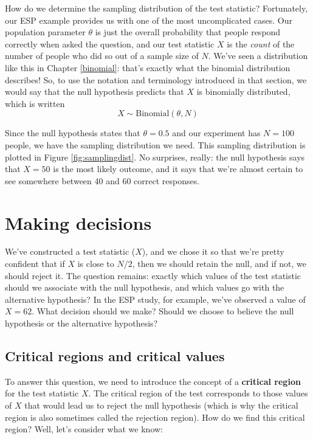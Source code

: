 \documentclass[
  11pt,
  a4paper,
  twoside,symmetric,openright]{book}
\theoremstyle{break}
\theoremstyle{break}
\begin{document}
How do we determine the sampling distribution of the test statistic? Fortunately, our ESP example provides us with one of the most uncomplicated cases. Our population parameter \(\theta\) is just the overall probability that people respond correctly when asked the question, and our test statistic \(X\) is the \emph{count} of the number of people who did so out of a sample size of \(N\). We've seen a distribution like this in Chapter \ref{binomial}: that's exactly what the binomial distribution describes! So, to use the notation and terminology introduced in that section, we would say that the null hypothesis predicts that \(X\) is binomially distributed, which is written
\[
X \sim \mbox{Binomial}(\theta,N)
\]

Since the null hypothesis states that \(\theta = 0.5\) and our experiment has \(N=100\) people, we have the sampling distribution we need. This sampling distribution is plotted in Figure \ref{fig:samplingdist}. No surprises, really: the null hypothesis says that \(X=50\) is the most likely outcome, and it says that we're almost certain to see somewhere between 40 and 60 correct responses.

\section{Making decisions}\label{decisionmaking}

We've constructed a test statistic (\(X\)), and we chose it so that we're pretty confident that if \(X\) is close to \(N/2\), then we should retain the null, and if not, we should reject it. The question remains: exactly which values of the test statistic should we associate with the null hypothesis, and which values go with the alternative hypothesis? In the ESP study, for example, we've observed a value of \(X=62\). What decision should we make? Should we choose to believe the null hypothesis or the alternative hypothesis?

\subsection{Critical regions and critical values}\label{critical-regions-and-critical-values}

To answer this question, we need to introduce the concept of a \textbf{critical region} for the test statistic \(X\). The critical region of the test corresponds to those values of \(X\) that would lead us to reject the null hypothesis (which is why the critical region is also sometimes called the rejection region). How do we find this critical region? Well, let's consider what we know:
\end{document}
